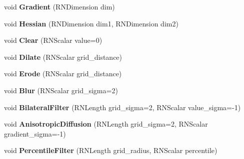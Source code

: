 \begin{DoxyCompactItemize}
\item 
void {\bfseries Gradient} (R\+N\+Dimension dim)\hypertarget{class_r3_planar_grid_aae375faa2aca791e3c2914d96a2c1c2b}{}\label{class_r3_planar_grid_aae375faa2aca791e3c2914d96a2c1c2b}

\item 
void {\bfseries Hessian} (R\+N\+Dimension dim1, R\+N\+Dimension dim2)\hypertarget{class_r3_planar_grid_a084f099aeeb7d41e1f7b97922e7c0bdb}{}\label{class_r3_planar_grid_a084f099aeeb7d41e1f7b97922e7c0bdb}

\item 
void {\bfseries Clear} (R\+N\+Scalar value=0)\hypertarget{class_r3_planar_grid_aed82a6b6f7f1804fcbb77bd76ee12f6a}{}\label{class_r3_planar_grid_aed82a6b6f7f1804fcbb77bd76ee12f6a}

\item 
void {\bfseries Dilate} (R\+N\+Scalar grid\+\_\+distance)\hypertarget{class_r3_planar_grid_a6dcba9a3711c9540fb40bdd8ee1e0d6a}{}\label{class_r3_planar_grid_a6dcba9a3711c9540fb40bdd8ee1e0d6a}

\item 
void {\bfseries Erode} (R\+N\+Scalar grid\+\_\+distance)\hypertarget{class_r3_planar_grid_ad3cedb4477986ed6bf66863e95074d11}{}\label{class_r3_planar_grid_ad3cedb4477986ed6bf66863e95074d11}

\item 
void {\bfseries Blur} (R\+N\+Scalar grid\+\_\+sigma=2)\hypertarget{class_r3_planar_grid_a3fee6311c4ba1d98e678a405a5b6eeb2}{}\label{class_r3_planar_grid_a3fee6311c4ba1d98e678a405a5b6eeb2}

\item 
void {\bfseries Bilateral\+Filter} (R\+N\+Length grid\+\_\+sigma=2, R\+N\+Scalar value\+\_\+sigma=-\/1)\hypertarget{class_r3_planar_grid_aeb9e3acf39be9185cdda63c7bba03459}{}\label{class_r3_planar_grid_aeb9e3acf39be9185cdda63c7bba03459}

\item 
void {\bfseries Anisotropic\+Diffusion} (R\+N\+Length grid\+\_\+sigma=2, R\+N\+Scalar gradient\+\_\+sigma=-\/1)\hypertarget{class_r3_planar_grid_acc379ce25a8e25246db2b3b22e089409}{}\label{class_r3_planar_grid_acc379ce25a8e25246db2b3b22e089409}

\item 
void {\bfseries Percentile\+Filter} (R\+N\+Length grid\+\_\+radius, R\+N\+Scalar percentile)\hypertarget{class_r3_planar_grid_a73c450a54d4d0152816dd14509461d18}{}\label{class_r3_planar_grid_a73c450a54d4d0152816dd14509461d18}


\end{DoxyCompactItemize}

